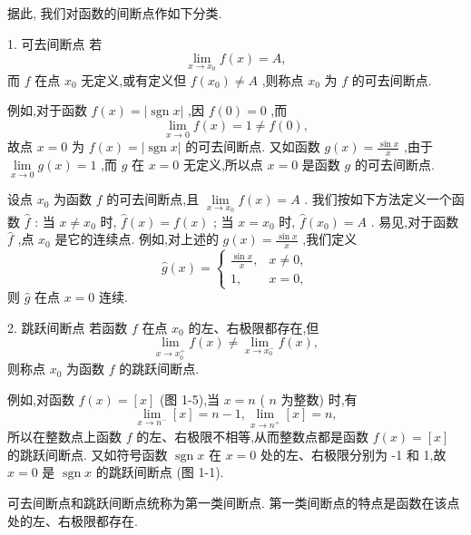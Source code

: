 据此, 我们对函数的间断点作如下分类.

1. 可去间断点 若
\[
\mathop{\lim }\limits_{{x \rightarrow  {x}_{0}}}f\left( x\right)  = A,
\]
而 \(f\) 在点 \({x}_{0}\) 无定义,或有定义但 \(f\left( {x}_{0}\right)  \neq  A\) ,则称点 \({x}_{0}\) 为 \(f\) 的可去间断点.

例如,对于函数 \(f\left( x\right)  = \left| {\operatorname{sgn}x}\right|\) ,因 \(f\left( 0\right)  = 0\) ,而
\[
\mathop{\lim }\limits_{{x \rightarrow  0}}f\left( x\right)  = 1 \neq  f\left( 0\right) ,
\]
故点 \(x = 0\) 为 \(f\left( x\right)  = \left| {\operatorname{sgn}x}\right|\) 的可去间断点. 又如函数 \(g\left( x\right)  = \frac{\sin x}{x}\) ,由于 \(\mathop{\lim }\limits_{{x \rightarrow  0}}g\left( x\right)  = 1\) ,而 \(g\) 在 \(x = 0\) 无定义,所以点 \(x = 0\) 是函数 \(g\) 的可去间断点.

设点 \({x}_{0}\) 为函数 \(f\) 的可去间断点,且 \(\mathop{\lim }\limits_{{x \rightarrow  {x}_{0}}}f\left( x\right)  = A\) . 我们按如下方法定义一个函数 \(\widehat{f}\) : 当 \(x \neq  {x}_{0}\) 时, \(\widehat{f}\left( x\right)  = f\left( x\right)\) ; 当 \(x = {x}_{0}\) 时, \(\widehat{f}\left( {x}_{0}\right)  = A\) . 易见,对于函数 \(\widehat{f}\) ,点 \({x}_{0}\) 是它的连续点. 例如,对上述的 \(g\left( x\right)  = \frac{\sin x}{x}\) ,我们定义
\[
\widehat{g}\left( x\right)  = \left\{  \begin{matrix} \frac{\sin x}{x}, & x \neq  0, \\  1, & x = 0, \end{matrix}\right.
\]
则 \(\widehat{g}\) 在点 \(x = 0\) 连续.

2. 跳跃间断点 若函数 \(f\) 在点 \({x}_{0}\) 的左、右极限都存在,但
\[
\mathop{\lim }\limits_{{x \rightarrow  {x}_{0}^{ + }}}f\left( x\right)  \neq  \mathop{\lim }\limits_{{x \rightarrow  {x}_{0}^{ - }}}f\left( x\right) ,
\]
则称点 \({x}_{0}\) 为函数 \(f\) 的跳跃间断点.

例如,对函数 \(f\left( x\right)  = \left\lbrack  x\right\rbrack\) (图 1-5),当 \(x = n\) ( \(n\) 为整数) 时,有
\[
\mathop{\lim }\limits_{{x \rightarrow  {n}^{ - }}}\left\lbrack  x\right\rbrack   = n - 1,\mathop{\lim }\limits_{{x \rightarrow  {n}^{ + }}}\left\lbrack  x\right\rbrack   = n,
\]
所以在整数点上函数 \(f\) 的左、右极限不相等,从而整数点都是函数 \(f\left( x\right)  = \left\lbrack  x\right\rbrack\) 的跳跃间断点. 又如符号函数 \(\operatorname{sgn}x\) 在 \(x = 0\) 处的左、右极限分别为 -1 和 1,故 \(x = 0\) 是 \(\operatorname{sgn}x\) 的跳跃间断点 (图 1-1).

可去间断点和跳跃间断点统称为第一类间断点. 第一类间断点的特点是函数在该点处的左、右极限都存在.

